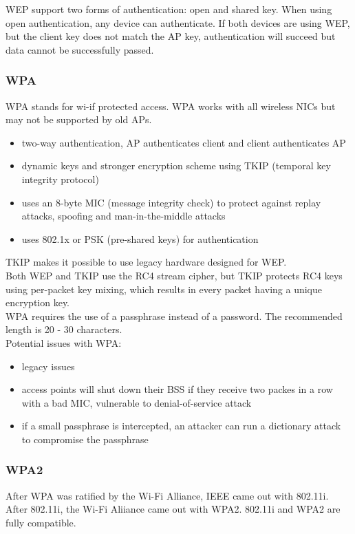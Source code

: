 WEP support two forms of authentication: open and shared key. When using open
authentication, any device can authenticate. If both devices are using WEP,
but the client key does not match the AP key, authentication will succeed but
data cannot be successfully passed.

\subsubsection{WPA}

WPA stands for wi-if protected access. WPA works with all wireless NICs but
may not be supported by old APs.

\begin{itemize}

\item two-way authentication, AP authenticates client and client authenticates
AP
\item dynamic keys and stronger encryption scheme using TKIP (temporal key
integrity protocol)
\item uses an 8-byte MIC (message integrity check) to protect against replay
attacks, spoofing and man-in-the-middle attacks
\item uses 802.1x or PSK (pre-shared keys) for authentication

\end{itemize}

TKIP makes it possible to use legacy hardware designed for WEP.\\

Both WEP and TKIP use the RC4 stream cipher, but TKIP protects RC4 keys using
per-packet key mixing, which results in every packet having a unique encryption
key.\\

WPA requires the use of a passphrase instead of a password. The recommended
length is 20 - 30 characters.\\

Potential issues with WPA:

\begin{itemize}

\item legacy issues
\item access points will shut down their BSS if they receive two packes in a
row with a bad MIC, vulnerable to denial-of-service attack
\item if a small passphrase is intercepted, an attacker can run a dictionary
attack to compromise the passphrase

\end{itemize}

\subsubsection{WPA2}

After WPA was ratified by the Wi-Fi Alliance, IEEE came out with 802.11i.
After 802.11i, the Wi-Fi Aliiance came out with WPA2. 802.11i and WPA2 are
fully compatible.
